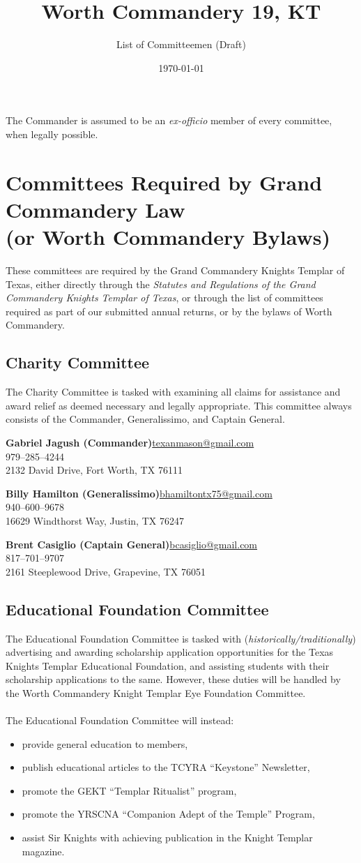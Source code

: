 \documentclass[letterpaper]{article}
\title{\vspace*{-5em}Worth Commandery \textnumero{} 19, KT\vspace*{-1em}}
\author{List of Committeemen (Draft)}
\date{\vspace*{-1em}\today}
\newcommand{\cman}[4]{\textbf{#1}\hfill{}\url{#2}\\\hphantom{0em}\hfill{}#3\\\hphantom{0em}\hfill{}#4}
\newcommand{\comm}[3]{\subsection*{#1 Committee\textsuperscript{#2}}The #1 Committee is tasked with #3\bigskip}
\newcommand{\mand}{\CrossMaltese}
\begin{document}
	\maketitle
	
	The Commander is assumed to be an \textit{ex-officio} member of every committee, when legally possible.
	
	\section*{Committees Required by Grand Commandery Law\\(or Worth Commandery Bylaws)}
	
	These committees are required by the Grand Commandery Knights Templar of Texas, either directly through the \textit{Statutes and Regulations of the Grand Commandery Knights Templar of Texas}, or through the list of committees required as part of our submitted annual returns, or by the bylaws of Worth Commandery.
	
	\comm{Charity}{\mand}{examining all claims for assistance and award relief as deemed necessary and legally appropriate. This committee always consists of the Commander, Generalissimo, and Captain General.}
	
		\cman{Gabriel Jagush (Commander)}{texanmason@gmail.com}{979--285--4244}{2132 David Drive, Fort Worth, TX 76111}
		
		\cman{Billy Hamilton (Generalissimo)}{bhamiltontx75@gmail.com}{940--600--9678}{16629 Windthorst Way, Justin, TX 76247}
		
		\cman{Brent Casiglio (Captain General)}{bcasiglio@gmail.com}{817--701--9707}{2161 Steeplewood Drive, Grapevine, TX 76051}
	
	\pagebreak
	
	\comm{Educational Foundation}{\mand}{(\textit{historically/traditionally}) advertising and awarding scholarship application opportunities for the Texas Knights Templar Educational Foundation, and assisting students with their scholarship applications to the same. However, these duties will be handled by the Worth Commandery Knight Templar Eye Foundation Committee.\\\\The Educational Foundation Committee will instead: \begin{itemize}\item{}provide general education to members,\item{}publish educational articles to the TCYRA ``Keystone'' Newsletter,\item{}promote the GEKT ``Templar Ritualist'' program,\item{}promote the YRSCNA ``Companion Adept of the Temple'' Program,\item{}assist Sir Knights with achieving publication in the Knight Templar magazine.\end{itemize}}
	
\end{document}
